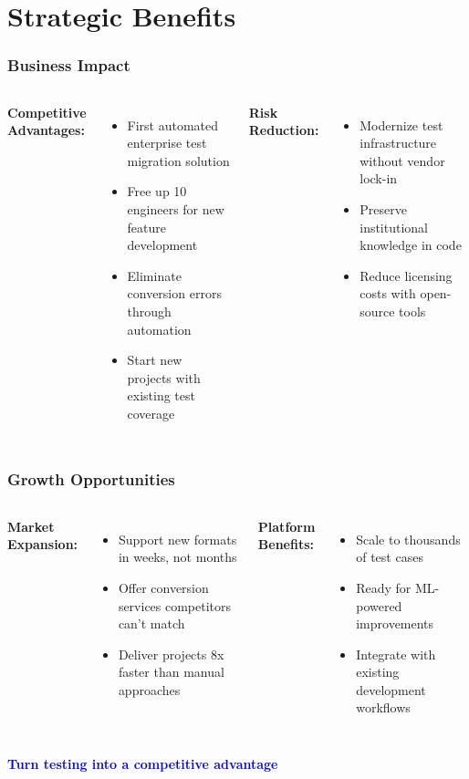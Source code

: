 \section{Strategic Benefits}

\begin{frame}
\frametitle{Business Impact}
\begin{columns}[T]
\textbf{Competitive Advantages:}
\vspace{0.2cm}
{\footnotesize
\begin{itemize}
    \item First automated enterprise test migration solution
    \item Free up 10 engineers for new feature development
    \item Eliminate conversion errors through automation
    \item Start new projects with existing test coverage
\end{itemize}
}


\textbf{Risk Reduction:}
\vspace{0.2cm}
{\footnotesize
\begin{itemize}
    \item Modernize test infrastructure without vendor lock-in
    \item Preserve institutional knowledge in code
    \item Reduce licensing costs with open-source tools
\end{itemize}
}
\end{columns}
\end{frame}

\begin{frame}
\frametitle{Growth Opportunities}
\begin{columns}
\textbf{Market Expansion:}
{\footnotesize
\begin{itemize}
    \item Support new formats in weeks, not months
    \item Offer conversion services competitors can't match
    \item Deliver projects 8x faster than manual approaches
\end{itemize}
}

\textbf{Platform Benefits:}
{\footnotesize
\begin{itemize}
    \item Scale to thousands of test cases
    \item Ready for ML-powered improvements
    \item Integrate with existing development workflows
\end{itemize}
}
\end{columns}

\vspace{0.3cm}
\begin{center}
\textcolor{blue}{\textbf{Turn testing into a competitive advantage}}
\end{center}
\end{frame}

